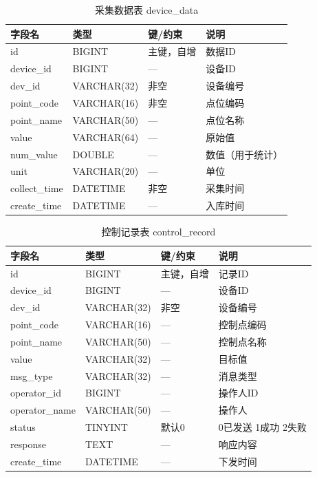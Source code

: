 \documentclass[12pt,hyperref,a4paper,UTF8]{ctexart}
\begin{document}
\begin{table}[!htbp]
    \centering
    \caption{采集数据表 device\_data}
    \begin{tabularx}{0.90\textwidth}{@{}L{3.0cm} L{3.2cm} L{2.5cm} Y@{}}
    \toprule
    \textbf{字段名} & \textbf{类型} & \textbf{键/约束} & \textbf{说明} \\
    \midrule
    id & BIGINT & 主键，自增 & 数据ID \\
    device\_id & BIGINT & — & 设备ID \\
    dev\_id & VARCHAR(32) & 非空 & 设备编号 \\
    point\_code & VARCHAR(16) & 非空 & 点位编码 \\
    point\_name & VARCHAR(50) & — & 点位名称 \\
    value & VARCHAR(64) & — & 原始值 \\
    num\_value & DOUBLE & — & 数值（用于统计） \\
    unit & VARCHAR(20) & — & 单位 \\
    collect\_time & DATETIME & 非空 & 采集时间 \\
    create\_time & DATETIME & — & 入库时间 \\
    \bottomrule
    \end{tabularx}
\end{table}

\begin{table}[!htbp]
    \centering
    \caption{控制记录表 control\_record}
    \begin{tabularx}{0.90\textwidth}{@{}L{3.0cm} L{3.2cm} L{2.5cm} Y@{}}
    \toprule
    \textbf{字段名} & \textbf{类型} & \textbf{键/约束} & \textbf{说明} \\
    \midrule
    id & BIGINT & 主键，自增 & 记录ID \\
    device\_id & BIGINT & — & 设备ID \\
    dev\_id & VARCHAR(32) & 非空 & 设备编号 \\
    point\_code & VARCHAR(16) & — & 控制点编码 \\
    point\_name & VARCHAR(50) & — & 控制点名称 \\
    value & VARCHAR(32) & — & 目标值 \\
    msg\_type & VARCHAR(32) & — & 消息类型 \\
    operator\_id & BIGINT & — & 操作人ID \\
    operator\_name & VARCHAR(50) & — & 操作人 \\
    status & TINYINT & 默认0 & 0已发送 1成功 2失败 \\
    response & TEXT & — & 响应内容 \\
    create\_time & DATETIME & — & 下发时间 \\
    \bottomrule
    \end{tabularx}
\end{table}
\end{document}
